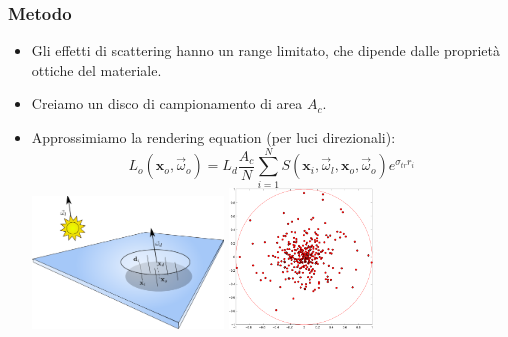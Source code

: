 \documentclass{beamer}
\newcommand{\vomega}{\vec{\omega}}
\newcommand{\x}{\mathbf{x}}
\begin{document}
\begin{frame}
    \frametitle{Metodo}
			\begin{itemize}
			\item Gli effetti di scattering hanno un range limitato, che dipende dalle proprietà ottiche del materiale.
			\item Creiamo un disco di campionamento di area $A_c$.
			\item Approssimiamo la rendering equation (per luci direzionali):
				\vspace{-0.3cm}
				$$
				L_o(\x_o,\vomega_o) = L_d \frac{A_c}{N} \sum_{i = 1}^N S(\x_i, \vomega_l, \x_o, \vomega_o)  e^{\sigma_{tr} r_i}
				$$
				\vspace{-0.6cm}
				\includegraphics[width=0.4\textwidth]{disk_setup.pdf} \hspace{1cm}	\includegraphics[width=0.3\textwidth]{halton_exp.pdf}
			\end{itemize}
\end{frame}
\end{document}
